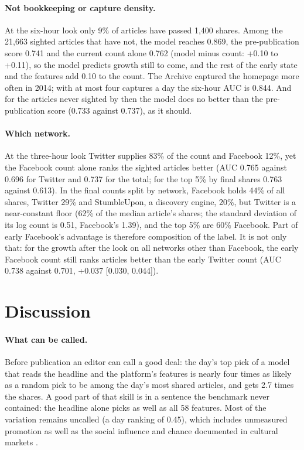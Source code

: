 \documentclass[10pt,a4paper,twocolumn]{article}
\begin{document}
\paragraph{Not bookkeeping or capture density.} At the six-hour look only 9\% of articles have passed
1{,}400 shares. Among the 21{,}663 sighted articles that have not, the model reaches 0.869, the pre-publication
score 0.741 and the current count alone 0.762 (model minus count: +0.10 to +0.11), so the model predicts growth
still to come, and the rest of the early state and the features add 0.10 to the count. The Archive captured the homepage more often in
2014; with at most four captures a day the six-hour AUC is 0.844. And for the articles never sighted by then the
model does no better than the pre-publication score (0.733 against 0.737), as it should.

\paragraph{Which network.} At the three-hour look Twitter supplies 83\% of the count and Facebook 12\%, yet the
Facebook count alone ranks the sighted articles better (AUC 0.765 against 0.696 for Twitter and 0.737 for the
total; for the top 5\% by final shares 0.763 against 0.613). In the final counts split by network, Facebook holds 44\% of all
shares, Twitter 29\% and StumbleUpon, a discovery engine, 20\%, but Twitter is a near-constant floor (62\% of the median article's shares;
the standard deviation of its log count is 0.51, Facebook's 1.39), and the top 5\% are 60\% Facebook. Part of early
Facebook's advantage is therefore composition of the label. It is not only that: for the growth after the look on
all networks other than Facebook, the early Facebook count still ranks articles better than the early Twitter count
(AUC 0.738 against 0.701, +0.037 [0.030, 0.044]).

\section{Discussion}
\label{sec:discussion}
\paragraph{What can be called.} Before publication an editor can call a good deal: the day's top pick of a
model that reads the headline and the platform's features is nearly four times as likely as a random pick to be
among the day's most shared articles, and gets 2.7 times the shares. A good part of that skill is in a sentence the
benchmark never contained: the headline alone picks as well as all 58 features. Most of the variation remains uncalled (a day ranking of 0.45), which includes
unmeasured promotion as well as the social influence and chance documented in cultural markets
\citep{salganik2006,martin2016}.
\end{document}
